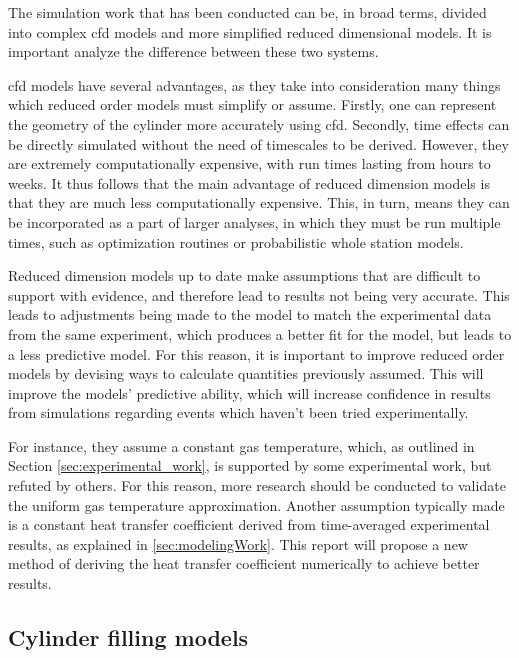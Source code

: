 The simulation work that has been conducted can be, in broad terms, divided into complex \gls{cfd} models and more simplified reduced dimensional models. It is important analyze the difference between these two systems. 

\Gls{cfd} models have several advantages, as they take into consideration many things which reduced order models must simplify or assume. Firstly, one can represent the geometry of the cylinder more accurately using \gls{cfd}. Secondly, time effects can be directly simulated without the need of timescales to be derived. However, they are extremely computationally expensive, with run times lasting from hours to weeks. It thus follows that the main advantage of reduced dimension models is that they are much less computationally expensive. This, in turn, means they can be incorporated as a part of larger analyses, in which they must be run multiple times, such as optimization routines or probabilistic whole station models.

Reduced dimension models up to date make assumptions that are difficult to support with evidence, and therefore lead to results not being very accurate. This leads to adjustments being made to the model to match the experimental data from the same experiment, which produces a better fit for the model, but leads to a less predictive model. For this reason, it is important to improve reduced order models by devising ways to calculate quantities previously assumed. This will improve the models' predictive ability, which will increase confidence in results from simulations regarding events which haven't been tried experimentally.

For instance, they assume a constant gas temperature, which, as outlined in Section \ref{sec:experimental_work}, is supported by some experimental work, but refuted by others. For this reason, more research should be conducted to validate the uniform gas temperature approximation. Another assumption typically made is a constant heat transfer coefficient derived from time-averaged experimental results, as explained in \cref{sec:modelingWork}. This report will propose a new method of deriving the heat transfer coefficient numerically to achieve better results.




\subsection{Cylinder filling models}


